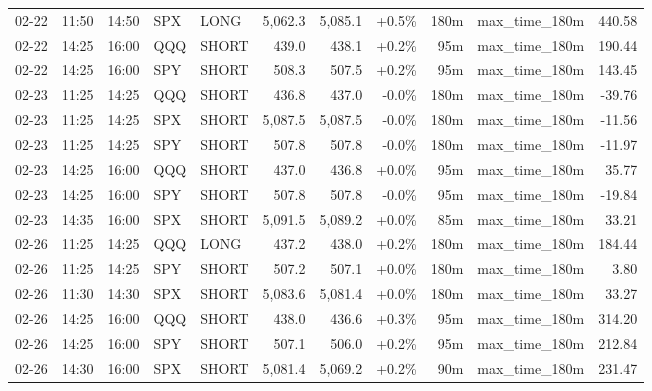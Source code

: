 \documentclass[11pt,a4paper,twoside]{article}
\begin{document}
\begin{center}
\begin{longtable}{>{\color{txtmain}}l l l l l r r r r >{\color{txtmain}}l r}
02-22 & 11:50 & 14:50 & SPX & LONG & 5,062.3 & 5,085.1 & \textcolor{wingreen}{+0.5\%} & 180m & max\_time\_180m & \textcolor{wingreen}{440.58} \\
02-22 & 14:25 & 16:00 & QQQ & SHORT & 439.0 & 438.1 & \textcolor{wingreen}{+0.2\%} & 95m & max\_time\_180m & \textcolor{wingreen}{190.44} \\
02-22 & 14:25 & 16:00 & SPY & SHORT & 508.3 & 507.5 & \textcolor{wingreen}{+0.2\%} & 95m & max\_time\_180m & \textcolor{wingreen}{143.45} \\
02-23 & 11:25 & 14:25 & QQQ & SHORT & 436.8 & 437.0 & \textcolor{lossred}{-0.0\%} & 180m & max\_time\_180m & \textcolor{lossred}{-39.76} \\
02-23 & 11:25 & 14:25 & SPX & SHORT & 5,087.5 & 5,087.5 & \textcolor{lossred}{-0.0\%} & 180m & max\_time\_180m & \textcolor{lossred}{-11.56} \\
02-23 & 11:25 & 14:25 & SPY & SHORT & 507.8 & 507.8 & \textcolor{lossred}{-0.0\%} & 180m & max\_time\_180m & \textcolor{lossred}{-11.97} \\
02-23 & 14:25 & 16:00 & QQQ & SHORT & 437.0 & 436.8 & \textcolor{wingreen}{+0.0\%} & 95m & max\_time\_180m & \textcolor{wingreen}{35.77} \\
02-23 & 14:25 & 16:00 & SPY & SHORT & 507.8 & 507.8 & \textcolor{lossred}{-0.0\%} & 95m & max\_time\_180m & \textcolor{lossred}{-19.84} \\
02-23 & 14:35 & 16:00 & SPX & SHORT & 5,091.5 & 5,089.2 & \textcolor{wingreen}{+0.0\%} & 85m & max\_time\_180m & \textcolor{wingreen}{33.21} \\
02-26 & 11:25 & 14:25 & QQQ & LONG & 437.2 & 438.0 & \textcolor{wingreen}{+0.2\%} & 180m & max\_time\_180m & \textcolor{wingreen}{184.44} \\
02-26 & 11:25 & 14:25 & SPY & SHORT & 507.2 & 507.1 & \textcolor{wingreen}{+0.0\%} & 180m & max\_time\_180m & \textcolor{wingreen}{3.80} \\
02-26 & 11:30 & 14:30 & SPX & SHORT & 5,083.6 & 5,081.4 & \textcolor{wingreen}{+0.0\%} & 180m & max\_time\_180m & \textcolor{wingreen}{33.27} \\
02-26 & 14:25 & 16:00 & QQQ & SHORT & 438.0 & 436.6 & \textcolor{wingreen}{+0.3\%} & 95m & max\_time\_180m & \textcolor{wingreen}{314.20} \\
02-26 & 14:25 & 16:00 & SPY & SHORT & 507.1 & 506.0 & \textcolor{wingreen}{+0.2\%} & 95m & max\_time\_180m & \textcolor{wingreen}{212.84} \\
02-26 & 14:30 & 16:00 & SPX & SHORT & 5,081.4 & 5,069.2 & \textcolor{wingreen}{+0.2\%} & 90m & max\_time\_180m & \textcolor{wingreen}{231.47} \\

\end{longtable}
\end{center}
\end{document}
